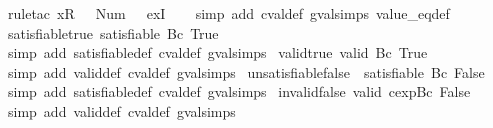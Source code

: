 \begin{isabellebody}
\ {\isacharparenleft}rule{\isacharunderscore}tac\ x{\isacharequal}{\isachardoublequoteopen}{\isacharless}R\ {}\ {\isacharcolon}{\isacharequal}\ Num\ {}{\isachargreater}{\isachardoublequoteclose}\ \ exI{\isacharparenright}\isanewline
\ \ \isamarkupfalse%
\ {\isacharparenleft}simp\ add{\isacharcolon}\ cval{\isacharunderscore}def\ gval{\isachardot}simps\ value_eq{\isacharunderscore}def{\isacharparenright}%
\endisatagproof
{\isafoldproof}%
%
\isadelimproof
\isanewline
%
\endisadelimproof
\isanewline
{}\isamarkupfalse%
\ satisfiable{\isacharunderscore}true{\isacharcolon}\ {\isachardoublequoteopen}satisfiable\ {\isacharparenleft}Bc\ True{\isacharparenright}{\isachardoublequoteclose}\isanewline
%
\isadelimproof
\ \ %
\endisadelimproof
%
\isatagproof
{}\isamarkupfalse%
\ {\isacharparenleft}simp\ add{\isacharcolon}\ satisfiable{\isacharunderscore}def\ cval{\isacharunderscore}def\ gval{\isachardot}simps{\isacharparenright}%
\endisatagproof
{\isafoldproof}%
%
\isadelimproof
\isanewline
%
\endisadelimproof
\isanewline
{}\isamarkupfalse%
\ valid{\isacharunderscore}true{\isacharcolon}\ {\isachardoublequoteopen}valid\ {\isacharparenleft}Bc\ True{\isacharparenright}{\isachardoublequoteclose}\isanewline
%
\isadelimproof
\ \ %
\endisadelimproof
%
\isatagproof
{}\isamarkupfalse%
\ {\isacharparenleft}simp\ add{\isacharcolon}\ valid{\isacharunderscore}def\ cval{\isacharunderscore}def\ gval{\isachardot}simps{\isacharparenright}%
\endisatagproof
{\isafoldproof}%
%
\isadelimproof
\isanewline
%
\endisadelimproof
\isanewline
{}\isamarkupfalse%
\ unsatisfiable{\isacharunderscore}false{\isacharcolon}\ {\isachardoublequoteopen}{\isasymnot}\ satisfiable\ {\isacharparenleft}Bc\ False{\isacharparenright}{\isachardoublequoteclose}\isanewline
%
\isadelimproof
\ \ %
\endisadelimproof
%
\isatagproof
{}\isamarkupfalse%
\ {\isacharparenleft}simp\ add{\isacharcolon}\ satisfiable{\isacharunderscore}def\ cval{\isacharunderscore}def\ gval{\isachardot}simps{\isacharparenright}%
\endisatagproof
{\isafoldproof}%
%
\isadelimproof
\isanewline
%
\endisadelimproof
\isanewline
{}\isamarkupfalse%
\ invalid{\isacharunderscore}false{\isacharcolon}\ {\isachardoublequoteopen}{\isasymnot}valid\ {\isacharparenleft}cexp{\isachardot}Bc\ False{\isacharparenright}{\isachardoublequoteclose}\isanewline
%
\isadelimproof
\ \ %
\endisadelimproof
%
\isatagproof
{}\isamarkupfalse%
\ {\isacharparenleft}simp\ add{\isacharcolon}\ valid{\isacharunderscore}def\ cval{\isacharunderscore}def\ gval{\isachardot}simps{\isacharparenright}%

\end{isabellebody}
